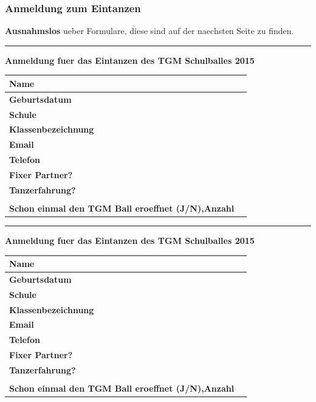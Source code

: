 \documentclass[12pt]{article}
\begin{document}
\subsubsection{Anmeldung zum Eintanzen}
\textbf{Ausnahmslos} ueber Formulare, diese sind auf der naechsten Seite zu finden.
\newpage
\rule{1.0\textwidth}{0.2mm}
\vspace{1cm}
\hspace{1cm}
\textbf{Anmeldung fuer das  Eintanzen des TGM Schulballes 2015} \\
\small
\hspace{3cm}
  \begin{tabular}{ | p{} | p{}|}
    \hline
\textbf{Name} & \\ 
    \hline 
 \textbf{Geburtsdatum} & \\  \hline 
 \textbf{Schule} & \\  \hline 
 \textbf{Klassenbezeichnung} & \\  \hline 
  \textbf{Email} & \\  \hline 
 \textbf{Telefon} & \\  \hline 

 \textbf{Fixer Partner? } & \\ \hline 
 \textbf{Tanzerfahrung? } & \\
  & \\ \hline 
 \textbf{Schon einmal den TGM Ball eroeffnet (J/N),Anzahl } & \\ \hline 
 \end{tabular}
\vspace{1.5cm}



\rule{1.0\textwidth}{0.2mm}
\vspace{1cm}
\hspace{1cm}
\textbf{Anmeldung fuer das  Eintanzen des TGM Schulballes 2015} \\
\small
\hspace{3cm}
  \begin{tabular}{ | p{} | p{}|}
    \hline
\textbf{Name} & \\ 
    \hline 
 \textbf{Geburtsdatum} & \\  \hline 
 \textbf{Schule} & \\  \hline 
 \textbf{Klassenbezeichnung} & \\  \hline 
  \textbf{Email} & \\  \hline 
 \textbf{Telefon} & \\  \hline 

 \textbf{Fixer Partner? } & \\ \hline 
 \textbf{Tanzerfahrung? } & \\
  & \\ \hline 
 \textbf{Schon einmal den TGM Ball eroeffnet (J/N),Anzahl } & \\ \hline 
 \end{tabular}
\vspace{0.5cm}
\newpage
\end{document}
